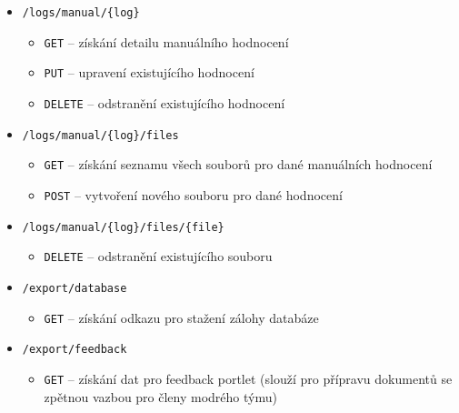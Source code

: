 \documentclass[
  digital,
  twoside,
  table, 
  nolof, 
  nolot
]{fithesis3}
\begin{document}
\begin{itemize}
    \item \texttt{/logs/manual/\{log\}}
    \begin{itemize}
        \item \texttt{GET} -- získání detailu manuálního hodnocení
        \item \texttt{PUT} -- upravení existujícího hodnocení
        \item \texttt{DELETE} -- odstranění existujícího hodnocení
    \end{itemize}
            
    \item \texttt{/logs/manual/\{log\}/files}
    \begin{itemize}
        \item \texttt{GET} -- získání seznamu všech souborů pro dané manuálních hodnocení
        \item \texttt{POST} -- vytvoření nového souboru pro dané hodnocení
    \end{itemize}
            
    \item \texttt{/logs/manual/\{log\}/files/\{file\}}
    \begin{itemize}
        \item \texttt{DELETE} -- odstranění existujícího souboru
    \end{itemize}
            
    \item \texttt{/export/database}
    \begin{itemize}
        \item \texttt{GET} -- získání odkazu pro stažení zálohy databáze
    \end{itemize}
                
    \item \texttt{/export/feedback}
    \begin{itemize}
        \item \texttt{GET} -- získání dat pro feedback portlet (slouží pro přípravu dokumentů se zpětnou vazbou pro členy modrého týmu)
    \end{itemize}

\end{itemize}
\end{document}
